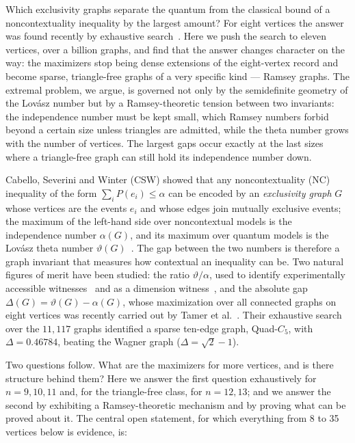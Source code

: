 \documentclass[11pt]{article}
\renewcommand{\theta}{\vartheta}
\newcommand{\gap}{\Delta}
\begin{document}
Which exclusivity graphs separate the quantum from the classical bound of a noncontextuality inequality by the largest amount? For eight vertices the answer was found recently by exhaustive search~\cite{tamer2026}. Here we push the search to eleven vertices, over a billion graphs, and find that the answer changes character on the way: the maximizers stop being dense extensions of the eight-vertex record and become sparse, triangle-free graphs of a very specific kind --- Ramsey graphs. The extremal problem, we argue, is governed not only by the semidefinite geometry of the Lov\'asz number but by a Ramsey-theoretic tension between two invariants: the independence number must be kept small, which Ramsey numbers forbid beyond a certain size unless triangles are admitted, while the theta number grows with the number of vertices. The largest gaps occur exactly at the last sizes where a triangle-free graph can still hold its independence number down.

Cabello, Severini and Winter (CSW) showed that any noncontextuality (NC) inequality of the form $\sum_i P(e_i)\le\alpha$ can be encoded by an \emph{exclusivity graph} $G$ whose vertices are the events $e_i$ and whose edges join mutually exclusive events; the maximum of the left-hand side over noncontextual models is the independence number $\alpha(G)$, and its maximum over quantum models is the Lov\'asz theta number $\theta(G)$~\cite{csw2014}. The gap between the two numbers is therefore a graph invariant that measures how contextual an inequality can be. Two natural figures of merit have been studied: the ratio $\theta/\alpha$, used to identify experimentally accessible witnesses~\cite{amselem2012,canas2016} and as a dimension witness~\cite{ray2021}, and the absolute gap $\gap(G)=\theta(G)-\alpha(G)$, whose maximization over all connected graphs on eight vertices was recently carried out by Tamer et al.~\cite{tamer2026}. Their exhaustive search over the $11{,}117$ graphs identified a sparse ten-edge graph, Quad-$C_5$, with $\gap=0.46784$, beating the Wagner graph ($\gap=\sqrt2-1$).

Two questions follow. What are the maximizers for more vertices, and is there structure behind them? Here we answer the first question exhaustively for $n=9,10,11$ and, for the triangle-free class, for $n=12,13$; and we answer the second by exhibiting a Ramsey-theoretic mechanism and by proving what can be proved about it. The central open statement, for which everything from 8 to 35 vertices below is evidence, is:
\end{document}
